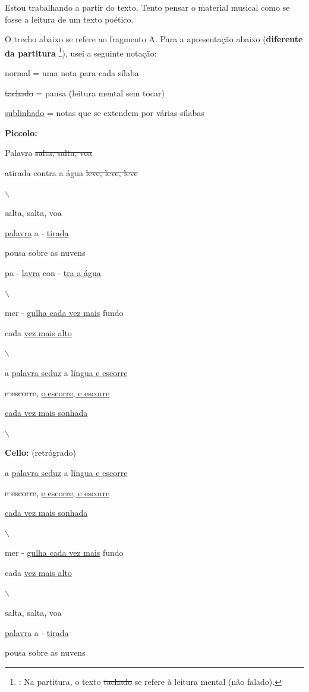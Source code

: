 \documentclass[a4paper, 12pt]{article}
\begin{document}
Estou trabalhando a partir do texto. Tento pensar o material musical como se fosse a leitura de um texto poético. 

O trecho abaixo se refere ao fragmento A. Para a apresentação abaixo (\textbf{diferente da partitura} \footnote{: Na partitura, o texto \sout{tachado} se refere à leitura mental (não falado).}), usei a seguinte notação:

normal = uma nota para cada sílaba

\sout{tachado} = pausa (leitura mental sem tocar)

\uline{sublinhado} = notas que se extendem por várias sílabas

\n

\textbf{Piccolo:}

Palavra \sout{salta, salta, voa}

atirada contra a água \sout{leve, leve, leve}

$\backslash$

salta, salta, voa

\uline{palavra} a - \uline{tirada}

pousa sobre as nuvens

pa - \uline{lavra} con - \uline{tra a água}

$\backslash$

mer - \uline{gulha cada vez mais} fundo

cada \uline{vez mais alto}

$\backslash$

a \uline{palavra seduz} a \uline{língua e escorre}

\sout{e escorre}, \uline{e escorre, e escorre}

\uline{cada vez mais sonhada}


$\backslash$


\textbf{Cello:} (retrógrado)

a \uline{palavra seduz} a \uline{língua e escorre}

\sout{e escorre}, \uline{e escorre, e escorre}

\uline{cada vez mais sonhada}

$\backslash$

mer - \uline{gulha cada vez mais} fundo

cada \uline{vez mais alto}

$\backslash$

salta, salta, voa

\uline{palavra} a - \uline{tirada}

pousa sobre as nuvens
\end{document}
